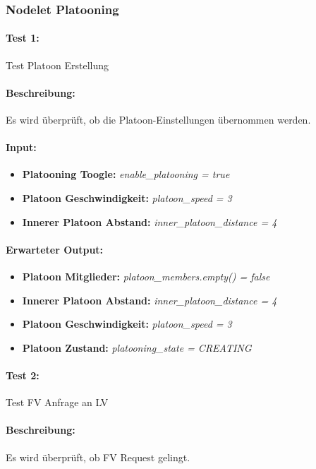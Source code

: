 \documentclass[a4paper, 12pt, titlepage]{scrartcl}
\begin{document}
			\subsubsection{Nodelet Platooning}
			\label{node_platooning}
			\paragraph{Test 1:}{Test Platoon Erstellung}
			\paragraph{Beschreibung:} Es wird überprüft, ob die Platoon-Einstellungen übernommen werden.
			\paragraph{Input:}
			\begin{itemize} \itemsep-0.5em
				\item \textbf{Platooning Toogle:} \emph{enable\_platooning = true}
				\item \textbf{Platoon Geschwindigkeit:} \emph{platoon\_speed = 3}
				\item \textbf{Innerer Platoon Abstand:} \emph{inner\_platoon\_distance = 4}
			\end{itemize}
			\paragraph{Erwarteter Output:}
			\begin{itemize} \itemsep-0.5em
				\item \textbf{Platoon Mitglieder:} \emph{platoon\_members.empty() = false}
				\item \textbf{Innerer Platoon Abstand:} \emph{inner\_platoon\_distance = 4}
				\item \textbf{Platoon Geschwindigkeit:} \emph{platoon\_speed = 3}
				\item \textbf{Platoon Zustand:} \emph{platooning\_state = CREATING}
			\end{itemize}
			
			\paragraph{Test 2:}{Test FV Anfrage an LV}
			\paragraph{Beschreibung:} Es wird überprüft, ob FV Request gelingt.
\end{document}
